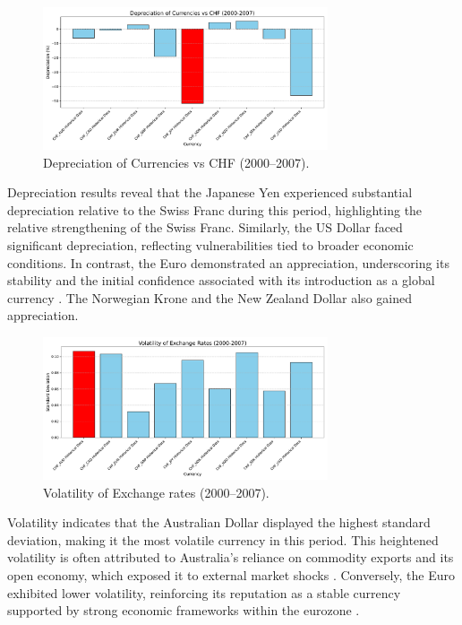 \documentclass[11pt,a4paper,english,oneside]{book}
\begin{document}
\begin{figure}[h!]
    \centering
    \includegraphics[width=0.75\textwidth]{../../images/depreciation_2000_2007.pdf}
    \caption{Depreciation of Currencies vs CHF (2000--2007).}
    \label{fig:depreciation_2000_2007}
\end{figure}

Depreciation results reveal that the Japanese Yen experienced substantial depreciation relative to the Swiss Franc during this period, highlighting the relative strengthening of the Swiss Franc. Similarly, the US Dollar faced significant depreciation, reflecting vulnerabilities tied to broader economic conditions. In contrast, the Euro demonstrated an appreciation, underscoring its stability and the initial confidence associated with its introduction as a global currency \parencite{EuropeanUnion2024}. The Norwegian Krone and the New Zealand Dollar also gained appreciation.

\begin{figure}[h!]
    \centering
    \includegraphics[width=0.75\textwidth]{../../images/volatility_2000_2007.pdf}
    \caption{Volatility of Exchange rates (2000--2007).}
    \label{fig:volatility_2000_2007}
\end{figure}

Volatility indicates that the Australian Dollar displayed the highest standard deviation, making it the most volatile currency in this period. This heightened volatility is often attributed to Australia's reliance on commodity exports and its open economy, which exposed it to external market shocks \parencite{chen2003commodity}. Conversely, the Euro exhibited lower volatility, reinforcing its reputation as a stable currency supported by strong economic frameworks within the eurozone \parencite{juncker2015completing}.
\end{document}
